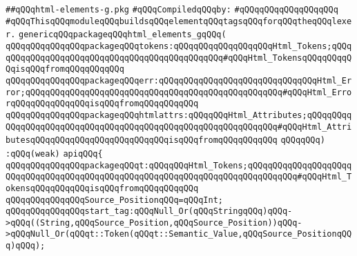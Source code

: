 \label{src/lib/html/html-elements-g.pkg}
\verb|##qQQqhtml-elements-g.pkg|\newline
\newline
\verb|#qQQqCompiledqQQqby:|\newline
\verb|#qQQqqQQqqQQqqQQqqQQq|\newline
\newline
\verb|#qQQqThisqQQqmoduleqQQqbuildsqQQqelementqQQqtagsqQQqforqQQqtheqQQqlexer.|\newline
\newline
\verb|genericqQQqpackageqQQqhtml_elements_gqQQq(|\newline
\verb|qQQqqQQqqQQqqQQqpackageqQQqtokens:qQQqqQQqqQQqqQQqqQQqHtml_Tokens;qQQqqQQqqQQqqQQqqQQqqQQqqQQqqQQqqQQqqQQqqQQqqQQq#qQQqHtml_TokensqQQqqQQqqQQqisqQQqfromqQQqqQQqqQQq|\newline
\verb|qQQqqQQqqQQqqQQqpackageqQQqerr:qQQqqQQqqQQqqQQqqQQqqQQqqQQqqQQqHtml_Error;qQQqqQQqqQQqqQQqqQQqqQQqqQQqqQQqqQQqqQQqqQQqqQQqqQQq#qQQqHtml_ErrorqQQqqQQqqQQqqQQqisqQQqfromqQQqqQQqqQQq|\newline
\verb|qQQqqQQqqQQqqQQqpackageqQQqhtmlattrs:qQQqqQQqHtml_Attributes;qQQqqQQqqQQqqQQqqQQqqQQqqQQqqQQqqQQqqQQqqQQqqQQqqQQqqQQqqQQqqQQq#qQQqHtml_AttributesqQQqqQQqqQQqqQQqqQQqqQQqqQQqisqQQqfromqQQqqQQqqQQq|\newline
\verb|qQQqqQQq)|\newline
\verb|:qQQq(weak)|\newline
\verb|apiqQQq{|\newline
\verb|qQQqqQQqqQQqqQQqpackageqQQqt:qQQqqQQqHtml_Tokens;qQQqqQQqqQQqqQQqqQQqqQQqqQQqqQQqqQQqqQQqqQQqqQQqqQQqqQQqqQQqqQQqqQQqqQQqqQQqqQQq#qQQqHtml_TokensqQQqqQQqqQQqisqQQqfromqQQqqQQqqQQq|\newline
\newline
\verb|qQQqqQQqqQQqqQQqSource_PositionqQQq=qQQqInt;|\newline
\newline
\verb|qQQqqQQqqQQqqQQqstart_tag:qQQqNull_Or(qQQqStringqQQq)qQQq->qQQq((String,qQQqSource_Position,qQQqSource_Position))qQQq->qQQqNull_Or(qQQqt::Token(qQQqt::Semantic_Value,qQQqSource_PositionqQQq)qQQq);|\newline
